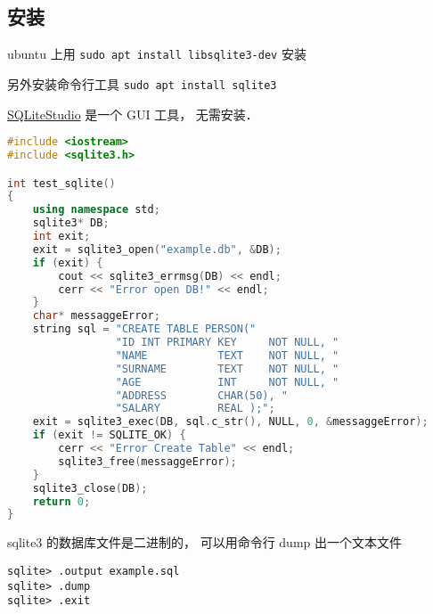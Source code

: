 
\begin{issues}
\issueDraft
\end{issues}

\subsection{安装}
ubuntu 上用 \verb|sudo apt install libsqlite3-dev| 安装

另外安装命令行工具 \verb|sudo apt install sqlite3|

\href{https://sqlitestudio.pl/}{SQLiteStudio} 是一个 GUI 工具， 无需安装．

\begin{lstlisting}[language=cpp]
#include <iostream>
#include <sqlite3.h>

int test_sqlite()
{
	using namespace std;
    sqlite3* DB;
    int exit;
    exit = sqlite3_open("example.db", &DB);
    if (exit) {
		cout << sqlite3_errmsg(DB) << endl;
        cerr << "Error open DB!" << endl;
    }
	char* messaggeError;
	string sql = "CREATE TABLE PERSON("
                 "ID INT PRIMARY KEY     NOT NULL, "
                 "NAME           TEXT    NOT NULL, "
                 "SURNAME        TEXT    NOT NULL, "
                 "AGE            INT     NOT NULL, "
                 "ADDRESS        CHAR(50), "
                 "SALARY         REAL );";
	exit = sqlite3_exec(DB, sql.c_str(), NULL, 0, &messaggeError);
    if (exit != SQLITE_OK) {
        cerr << "Error Create Table" << endl;
        sqlite3_free(messaggeError);
    }
    sqlite3_close(DB);
    return 0;
}
\end{lstlisting}

sqlite3 的数据库文件是二进制的， 可以用命令行 dump 出一个文本文件
\begin{lstlisting}
sqlite> .output example.sql
sqlite> .dump
sqlite> .exit
\end{lstlisting}
